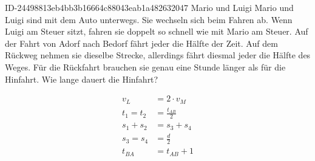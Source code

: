 \begin{exercise}
      {ID-24498813eb4bb3b16664c88043eab1a482632047}
      {Mario und Luigi}
  \ifproblem\problem
    Mario und Luigi sind mit dem Auto unterwegs. Sie wechseln sich beim
    Fahren ab. Wenn Luigi am Steuer sitzt, fahren sie doppelt so schnell wie
    mit Mario am Steuer. Auf der Fahrt von Adorf nach Bedorf fährt jeder die
    Hälfte der Zeit. Auf dem Rückweg nehmen sie dieselbe Strecke, allerdings
    fährt diesmal jeder die Hälfte des Weges. Für die Rückfahrt brauchen sie
    genau eine Stunde länger als für die Hinfahrt. Wie lange dauert die
    Hinfahrt?
  \fi
  \ifoutline\outline
    \begin{minipage}{0.49\textwidth}
      \centering
    \end{minipage}%
    \hfill
    \begin{minipage}{0.49\textwidth}
      \begin{equation*}
        \begin{split}
        v_{L}&=2\cdot v_{M} \\
        t_{1}=t_{2}&=\frac{t_{AB}}{2} \\
        s_{1}+s_{2}&=s_{3}+s_{4} \\
        s_{3}=s_{4}&=\frac{d}{2} \\
        t_{B\!A}&=t_{AB}+1
        \end{split}
      \end{equation*}
    \end{minipage}\bigskip

\end{exercise}
